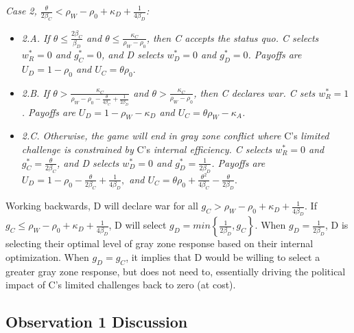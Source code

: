 \documentclass[
]{article}
\begin{document}
\textit{Case 2, $\frac{\theta}{2\beta_{C}}<\rho_{W}-\rho_{0}+\kappa_{D}+\frac{1}{4\beta_{D}}$:}

\begin{itemize}
  \item \textit{2.A. If $\theta\leq\frac{2\beta_{C}}{\beta_{D}}$ and $\theta\leq\frac{\kappa_{C}}{\rho_{W}-\rho_{0}}$, then C accepts the status quo. C selects $w_{R}^{*}=0$ and $g_{C}^{*}=0$, and D selects $w_{D}^{*}=0$ and $g_{D}^{*}=0$. Payoffs are $U_{D}=1-\rho_{0}$ and $U_{C}=\theta\rho_{0}.$} 
  \item \textit{2.B. If $\theta>\frac{\kappa_{C}}{\rho_{W}-\rho_{0}-\frac{\theta}{4\beta_{C}}+\frac{1}{2\beta_{D}}}$ and $\theta>\frac{\kappa_{C}}{\rho_{W}-\rho_{0}}$, then C declares war. C sets $w_{R}^{*}=1$. Payoffs are $U_{D}=1-\rho_{W}-\kappa_{D}$ and $U_{C}=\theta\rho_{W}-\kappa_{A}$.} 
  \item \textit{2.C. Otherwise, the game will end in gray zone conflict where }C's\textit{ limited challenge is constrained by }C's\textit{ internal efficiency. C selects $w_{R}^{*}=0$ and $g_{C}^{*}=\frac{\theta}{2\beta_{C}}$, and D selects $w_{D}^{*}=0$ and $g_{D}^{*}=\frac{1}{2\beta_{D}}$. Payoffs are $U_{D}=1-\rho_{0}-\frac{\theta}{2\beta_{C}}+\frac{1}{4\beta_{D}},$ and $U_{C}=\theta\rho_{0}+\frac{\theta^{2}}{4\beta_{C}}-\frac{\theta}{2\beta_{D}}.$} 
  \end{itemize}

Working backwards, D will declare war for all \(g_{C}>\rho_{W}-\rho_{0}+\kappa_{D}+\frac{1}{4\beta_{D}}\). If \(g_{C}\leq\rho_{W}-\rho_{0}+\kappa_{D}+\frac{1}{4\beta_{D}}\), D will select \(g_{D}=min\left\{ \frac{1}{2\beta_{D}},g_{C}\right\}\). When \(g_{D}=\frac{1}{2\beta_{D}}\), D is selecting their optimal level of gray zone response based on their internal optimization. When \(g_{D}=g_{C}\), it implies that D would be willing to select a greater gray zone response, but does not need to, essentially driving the political impact of C's limited challenges back to zero (at cost).

\hypertarget{observation-1-discussion}{%
\subsection{Observation 1 Discussion}\label{observation-1-discussion}}
\end{document}

